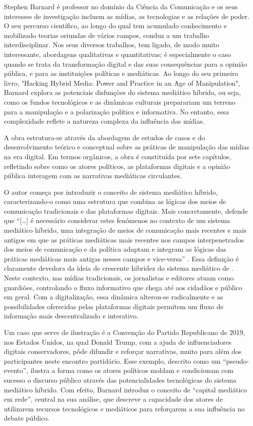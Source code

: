 \documentclass[portuguese]{textolivre}
\begin{document}
Stephen Barnard é professor no domínio da Ciência da Comunicação e os seus interesses de investigação incluem as mídias, as tecnologias e as relações de poder. O seu percurso científico, ao longo do qual tem acumulado conhecimento e mobilizado teorias oriundas de vários campos, conduz a um trabalho interdisciplinar. Nos seus diversos trabalhos, tem ligado, de modo muito interessante, abordagens qualitativas e quantitativas; é especialmente o caso quando se trata da transformação digital e das suas consequências para a opinião pública, e para as instituições políticas e mediáticas. Ao longo do seu primeiro livro, "Hacking Hybrid Media: Power and Practice in an Age of Manipulation", Barnard explora as potenciais disfunções do sistema mediático híbrido, ou seja, como os fundos tecnológicos e as dinâmicas culturais preparariam um terreno para a manipulação e a polarização política e informativa. No entanto, essa complexidade reflete a natureza complexa da influência das mídias. 

A obra estrutura-se através da abordagem de estudos de casos e do desenvolvimento teórico e conceptual sobre as práticas de manipulação das mídias na era digital. Em termos orgânicos, a obra é constituída por sete capítulos, refletindo sobre como os atores políticos, as plataformas digitais e a opinião pública interagem com as narrativas mediáticas circulantes.

O autor começa por introduzir o conceito de sistema mediático híbrido, caracterizando-o como uma estrutura que combina as lógicas dos meios de comunicação tradicionais e das plataformas digitais. Mais concretamente, defende que “[…] é necessário considerar estes fenómenos no contexto de um sistema mediático híbrido, uma integração de meios de comunicação mais recentes e mais antigos em que as práticas mediáticas mais recentes nos campos interpenetrados dos meios de comunicação e da política adaptam e integram as lógicas das práticas mediáticas mais antigas nesses campos e vice-versa” \cite[p. 17 tradução nossa]{barnard2024}. Essa definição é claramente devedora da ideia de crescente hibridez do sistema mediático de \textcite{chadwick2017}. Neste contexto, nas mídias tradicionais, os jornalistas e editores atuam como guardiões, controlando o fluxo informativo que chega até aos cidadãos e público em geral. Com a digitalização, essa dinâmica alterou-se radicalmente e as possibilidades oferecidas pelas plataformas digitais permitem um fluxo de informação mais descentralizado e interativo.

Um caso que serve de ilustração é a Convenção do Partido Republicano de 2019, nos Estados
Unidos, na qual Donald Trump, com a ajuda de influenciadores digitais conservadores, pôde
difundir e reforçar narrativas, muito para além dos participantes neste encontro partidário. Esse exemplo, descrito como um “pseudo-evento”, ilustra a forma como os atores políticos moldam e condicionam com sucesso o discurso público através das potencialidades tecnológicas do sistema mediático híbrido. Com efeito, Barnard introduz o conceito de “capital mediático em rede”, central na sua análise, que descreve a capacidade dos atores de utilizarem recursos tecnológicos e mediáticos para reforçarem a sua influência no debate público.
\end{document}
